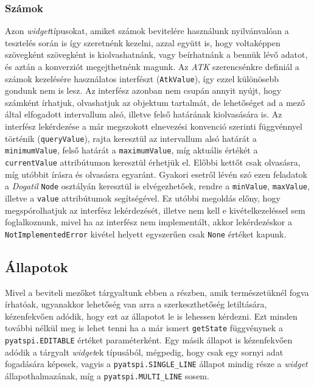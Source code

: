 \subsubsection{Számok}

Azon \textit{widget}típusokat, amiket számok bevitelére használunk nyilvánvalóan a tesztelés során is így szeretnénk kezelni, azzal együtt is, hogy voltaképpen szövegként szövegként is kiolvashatnánk, vagy beírhatnánk a bennük lévő adatot, és aztán a konverziót megejthetnénk magunk. Az \textit{ATK} szerencsénkre definiál a számok kezelésére használatos interfészt (\texttt{AtkValue}), így ezzel különösebb gondunk nem is lesz. Az interfész azonban nem csupán annyit nyújt, hogy számként írhatjuk, olvashatjuk az objektum tartalmát, de lehetőséget ad a mező által elfogadott intervallum alsó, illetve felső határának kiolvasására is. Az interfész lekérdezése a már megszokott elnevezési konvenció szerinti függvénnyel történik (\texttt{queryValue}), rajta keresztül az intervallum alsó határát a \texttt{minimumValue}, felső határát a \texttt{maximumValue}, míg aktuális értékét a \texttt{currentValue} attribútumon keresztül érhetjük el. Előbbi kettőt csak olvasásra, míg utóbbit írásra és olvasásra egyaránt. Gyakori esetről lévén szó ezen feladatok a \textit{Dogatil} \texttt{Node} osztályán keresztül is elvégezhetőek, rendre a \texttt{minValue}, \texttt{maxValue}, illetve a \texttt{value} attribútumok segítségével. Ez utóbbi megoldás előny, hogy megspórolhatjuk az interfész lekérdezését, illetve nem kell e kivételkezeléssel sem foglalkoznunk, mivel ha az interfész nem implementált, akkor lekérdezéskor a \texttt{NotImplementedError} kivétel helyett egyszerűen csak \texttt{None} értéket kapunk.

\subsection{Állapotok}

Mivel a beviteli mezőket tárgyaltunk ebben a részben, amik természetüknél fogva írhatóak, ugyanakkor lehetőség van arra a szerkeszthetőség letiltására, kézenfekvően adódik, hogy ezt az állapotot le is lehessen kérdezni. Ezt minden további nélkül meg is lehet tenni ha a már ismert \texttt{getState} függvénynek a \texttt{pyatspi.EDITABLE} értéket paraméterként. Egy másik állapot is kézenfekvően adódik a tárgyalt \textit{widget}ek típusából, mégpedig, hogy csak egy sornyi adat fogadására képesek, vagyis a \texttt{pyatspi.SINGLE\_LINE} állapot mindig része a \textit{widget} állapothalmazának, míg a \texttt{pyatspi.MULTI\_LINE} sosem.


